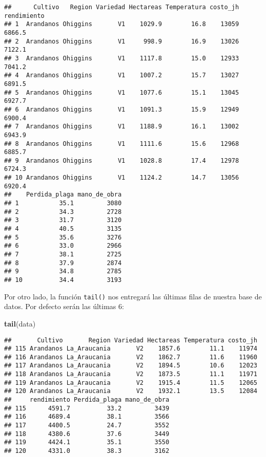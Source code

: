 \documentclass[]{book}
\newenvironment{Shaded}{\begin{snugshade}}{\end{snugshade}}
\newcommand{\KeywordTok}[1]{\textcolor[rgb]{0.13,0.29,0.53}{\textbf{#1}}}
\newcommand{\NormalTok}[1]{#1}
\begin{document}
\begin{verbatim}
##      Cultivo   Region Variedad Hectareas Temperatura costo_jh rendimiento
## 1  Arandanos Ohiggins       V1    1029.9        16.8    13059      6866.5
## 2  Arandanos Ohiggins       V1     998.9        16.9    13026      7122.1
## 3  Arandanos Ohiggins       V1    1117.8        15.0    12933      7041.2
## 4  Arandanos Ohiggins       V1    1007.2        15.7    13027      6891.5
## 5  Arandanos Ohiggins       V1    1077.6        15.1    13045      6927.7
## 6  Arandanos Ohiggins       V1    1091.3        15.9    12949      6900.4
## 7  Arandanos Ohiggins       V1    1188.9        16.1    13002      6943.9
## 8  Arandanos Ohiggins       V1    1111.6        15.6    12968      6885.7
## 9  Arandanos Ohiggins       V1    1028.8        17.4    12978      6724.3
## 10 Arandanos Ohiggins       V1    1124.2        14.7    13056      6920.4
##    Perdida_plaga mano_de_obra
## 1           35.1         3080
## 2           34.3         2728
## 3           31.7         3120
## 4           40.5         3135
## 5           35.6         3276
## 6           33.0         2966
## 7           38.1         2725
## 8           37.9         2874
## 9           34.8         2785
## 10          34.4         3193
\end{verbatim}

Por otro lado, la función \texttt{tail()} nos entregará las últimas filas de nuestra base de datos. Por defecto serán
las últimas 6:

\begin{Shaded}
\begin{Highlighting}[]
\KeywordTok{tail}\NormalTok{(data)}
\end{Highlighting}
\end{Shaded}

\begin{verbatim}
##       Cultivo       Region Variedad Hectareas Temperatura costo_jh
## 115 Arandanos La_Araucania       V2    1857.6        11.1    11974
## 116 Arandanos La_Araucania       V2    1862.7        11.6    11960
## 117 Arandanos La_Araucania       V2    1894.5        10.6    12023
## 118 Arandanos La_Araucania       V2    1873.5        11.1    11971
## 119 Arandanos La_Araucania       V2    1915.4        11.5    12065
## 120 Arandanos La_Araucania       V2    1932.1        13.5    12084
##     rendimiento Perdida_plaga mano_de_obra
## 115      4591.7          33.2         3439
## 116      4689.4          38.1         3566
## 117      4400.5          24.7         3552
## 118      4380.6          37.6         3449
## 119      4424.1          35.1         3550
## 120      4331.0          38.3         3162
\end{verbatim}
\end{document}
